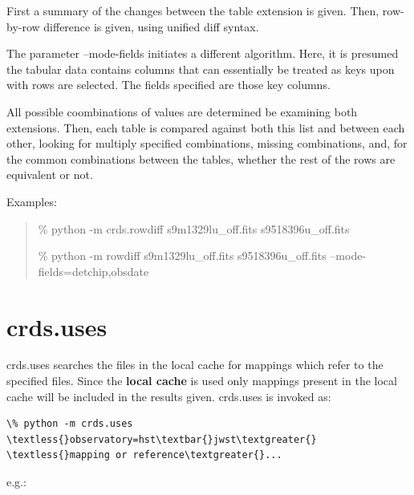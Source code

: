 \documentclass[letterpaper,10pt,english]{sphinxmanual}
\begin{document}
First a summary of the changes between the table extension is given.
Then, row-by-row difference is given, using unified diff syntax.

The parameter --mode-fields initiates a different algorithm.
Here, it is presumed the tabular data contains columns that can essentially
be treated as keys upon with rows are selected. The fields specified are those
key columns.

All possible coombinations of values are determined be examining both
extensions. Then, each table is compared against both this list and between
each other, looking for multiply specified combinations, missing combinations,
and, for the common combinations between the tables, whether the rest of the
rows are equivalent or not.

Examples:
\begin{quote}

\% python -m crds.rowdiff s9m1329lu\_off.fits s9518396u\_off.fits

\% python -m rowdiff s9m1329lu\_off.fits s9518396u\_off.fits --mode-fields=detchip,obsdate
\end{quote}


\section{crds.uses}
\label{command_line_tools:crds-uses}
crds.uses searches the files in the local cache for mappings which refer to the
specified files.  Since the \textbf{local cache} is used only mappings present in the
local cache will be included in the results given.  crds.uses is invoked as:

\begin{Verbatim}[commandchars=\\\{\}]
\% python -m crds.uses \textless{}observatory=hst\textbar{}jwst\textgreater{} \textless{}mapping or reference\textgreater{}...
\end{Verbatim}

e.g.:
\end{document}
